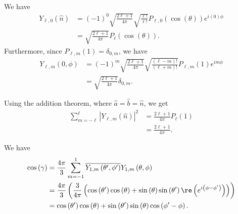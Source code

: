 \documentclass[10pt]{mypackage}
\begin{document}
\begin{solution}[35.12]
  We have
  \begin{align*}
    Y_{\ell,0}\left( \hat{n} \right) &= \left( -1 \right)^{0}\sqrt{\frac{2\ell + 1}{4\pi}}\sqrt{\frac{\ell!}{\ell!}}P_{\ell,0}\left( \cos\left( \theta \right) \right)e^{i\left( 0 \right)\phi}\\
                                     &= \sqrt{\frac{2\ell + 1}{4\pi}}P_{\ell}\left( \cos\left( \theta \right) \right).
  \end{align*}
  Furthermore, since $P_{\ell,m}\left( 1 \right) = \delta_{0,m}$, we have
  \begin{align*}
    Y_{\ell,m}\left( 0,\phi \right) &= \left( -1 \right)^{m}\sqrt{\frac{2\ell + 1}{4\pi}}\sqrt{\frac{\left( \ell-m \right)!}{\left( \ell + m \right)!}}P_{\ell,m}\left( 1 \right)e^{im\phi}\\
                                    &= \sqrt{\frac{2\ell + 1}{4\pi}}\delta_{0,m}.
  \end{align*}
  
\end{solution}
\begin{solution}[35.16]
  Using the addition theorem, where $\hat{a} = \hat{b} = \hat{n}$, we get
  \begin{align*}
    \sum_{m=-\ell}^{\ell}\left\vert Y_{\ell,m}\left( \hat{n} \right) \right\vert^2 &= \frac{2\ell + 1}{4\pi}P_{\ell}\left( 1 \right)\\
                                                                                   &= \frac{2\ell + 1}{4\pi}.
  \end{align*}
\end{solution}
\begin{solution}[35.17 (c)]
  We have
  \begin{align*}
    \cos\left( \gamma \right) &= \frac{4\pi}{3}\sum_{m=-1}^{1} \overline{Y_{1,m}\left( \theta',\phi' \right)} Y_{1,m}\left( \theta,\phi \right)\\
                              &= \frac{4\pi}{3} \left( \frac{3}{4\pi}\left( \cos\left( \theta' \right)\cos\left( \theta \right) + \sin\left( \theta \right)\sin\left( \theta' \right)\re\left( e^{i\left( \phi-\phi' \right)} \right) \right) \right)\\
                              &= \cos\left( \theta' \right)\cos\left( \theta \right) + \sin\left( \theta' \right)\sin\left( \theta \right)\cos\left( \phi'-\phi \right).
  \end{align*}
\end{solution}
\end{document}
